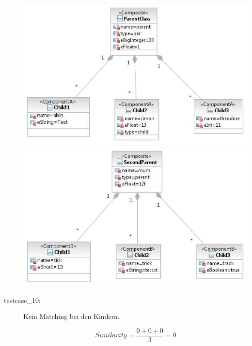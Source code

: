 \documentclass[a4paper]{article}
\begin{document}
\begin{description}
	\includegraphics[scale=0.5]{CompareChildrenMatchedOrSimilarTestScreens/Testcase09model1.jpeg}
	\includegraphics[scale=0.5]{CompareChildrenMatchedOrSimilarTestScreens/Testcase09model2.jpeg}

  \item[testcase\_10:]  Kein Matching bei den Kindern.
    
   \begin{equation*}
   Similarity = \frac{0+0+0}{3}=0
   \end{equation*}
    

\end{description}
\end{document}

